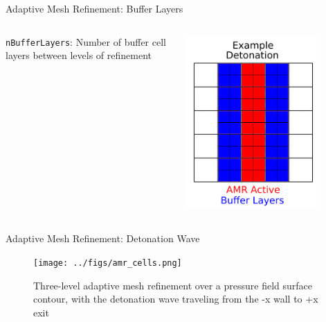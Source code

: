 \begin{frame}{Adaptive Mesh Refinement: Buffer Layers}
\begin{columns}
\texttt{nBufferLayers}: Number of buffer cell layers between levels of refinement
\begin{center}
\includegraphics[width=0.8\textwidth]{../figs/amr_buffer.png}
\end{center}
\end{columns}
\end{frame}


\begin{frame}{Adaptive Mesh Refinement: Detonation Wave}
\begin{figure}
\centering
\texttt{[image: ../figs/amr\_cells.png]}
\caption{Three-level adaptive mesh refinement over a pressure field surface contour, with the detonation wave traveling from the -x wall to +x exit}
\end{figure}
\end{frame}

